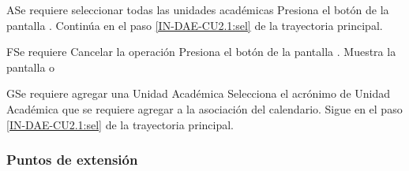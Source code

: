 
\begin{UCtrayectoriaA}{A}{Se requiere seleccionar todas las unidades académicas }
	\UCpaso [\UCactor] 	Presiona el botón  de la pantalla .
	\UCpaso Continúa en el paso \ref{IN-DAE-CU2.1:sel}  de la trayectoria principal.
\end{UCtrayectoriaA}


\begin{UCtrayectoriaA}{F}{Se requiere Cancelar la operación}
	\UCpaso [\UCactor] 	Presiona el botón  de la pantalla .
	\UCpaso Muestra la pantalla  o  
\end{UCtrayectoriaA}


\begin{UCtrayectoriaA}{G}{Se requiere agregar una Unidad Académica}
	\UCpaso [\UCactor]  Selecciona el acrónimo de Unidad Académica que se requiere agregar a la asociación del calendario. 
	\UCpaso Sigue en el paso \ref{IN-DAE-CU2.1:sel}  de la trayectoria principal.
\end{UCtrayectoriaA}


\subsubsection{Puntos de extensión}

